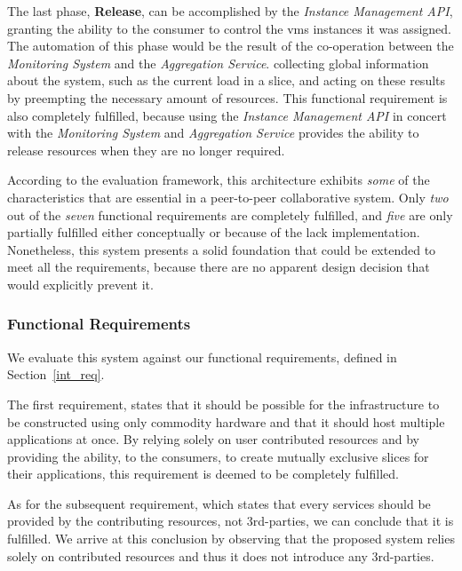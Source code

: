 \documentclass[12pt, titlepage]{uo_temp}
\begin{document}
     The last phase, \textbf{Release}, can be accomplished by the \emph{Instance
       Management API}, granting the ability to the consumer to control the \gls{vm}s
     instances it was assigned. The automation of this phase would be the result of the
     co-operation between the \emph{Monitoring System} and the \emph{Aggregation Service}.
     collecting global information about the system, such as the current load in a
     slice, and acting on these results by preempting the necessary amount of
     resources. This functional requirement is also completely fulfilled, because using
     the \emph{Instance Management API} in concert with the \emph{Monitoring System} and
     \emph{Aggregation Service} provides the ability to release resources when they are no
     longer required.

     According to the evaluation framework, this architecture exhibits \emph{some} of the
     characteristics that are essential in a peer-to-peer collaborative system. Only
     \emph{two} out of the \emph{seven} functional requirements are completely fulfilled,
     and \emph{five} are only partially fulfilled either conceptually or because of the
     lack implementation. Nonetheless, this system presents a solid foundation that could
     be extended to meet all the requirements, because there are no apparent design decision
     that would explicitly prevent it.

     \subsubsection{Functional Requirements}
     We evaluate this system against our functional requirements, defined in
     Section~\ref{int_req}.

     The first requirement, states that it should be possible for the infrastructure to be
     constructed using only commodity hardware and that it should host multiple
     applications at once. By relying solely on user contributed resources and by
     providing the ability, to the consumers, to create mutually exclusive slices for their
     applications, this requirement is deemed to be completely fulfilled.

     As for the subsequent requirement, which states that every services should be
     provided by the contributing resources, not 3rd-parties, we can conclude that it is
     fulfilled. We arrive at this conclusion by observing that the proposed system relies
     solely on contributed resources and thus it does not introduce any 3rd-parties.
\end{document}
